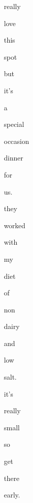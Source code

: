 \documentclass[varwidth]{standalone}
\begin{document}
 \begin{CJK*}{UTF8}{gbsn} 
{\setlength{\fboxsep}{0pt}\colorbox{white!0}{\parbox{0.9\textwidth}{
\colorbox{red!25.78403091430664}{\strut really} 
\colorbox{red!82.8896484375}{\strut love} 
\colorbox{red!12.768372535705566}{\strut this} 
\colorbox{red!14.709811210632324}{\strut spot} 
\colorbox{red!56.652462005615234}{\strut but} 
\colorbox{red!62.284236907958984}{\strut it's} 
\colorbox{red!0.0}{\strut a} 
\colorbox{red!100.0}{\strut special} 
\colorbox{red!39.66757583618164}{\strut occasion} 
\colorbox{red!37.54485321044922}{\strut dinner} 
\colorbox{red!28.230497360229492}{\strut for} 
\colorbox{red!22.46774673461914}{\strut us.} 
\colorbox{red!91.18738555908203}{\strut they} 
\colorbox{red!49.26097106933594}{\strut worked} 
\colorbox{red!72.40953826904297}{\strut with} 
\colorbox{red!65.79751586914062}{\strut my} 
\colorbox{red!26.874765396118164}{\strut diet} 
\colorbox{red!30.769603729248047}{\strut of} 
\colorbox{red!73.89772033691406}{\strut non} 
\colorbox{red!56.67512893676758}{\strut dairy} 
\colorbox{red!34.31329345703125}{\strut and} 
\colorbox{red!50.110755920410156}{\strut low} 
\colorbox{red!57.1068000793457}{\strut salt.} 
\colorbox{red!28.480806350708008}{\strut it's} 
\colorbox{red!17.157169342041016}{\strut really} 
\colorbox{red!15.19737434387207}{\strut small} 
\colorbox{red!78.70462799072266}{\strut so} 
\colorbox{red!24.003494262695312}{\strut get} 
\colorbox{red!28.071346282958984}{\strut there} 
\colorbox{red!60.762351989746094}{\strut early.} 

}}}\end{CJK*}
\end{document}

